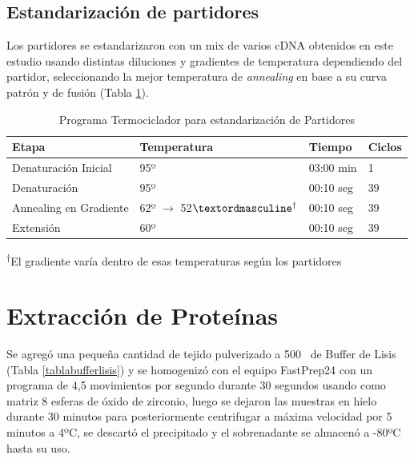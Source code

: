 \documentclass[12pt,a4paper,oneside]{scrbook}
\begin{document}
\subsection{Estandarización de partidores}

Los partidores se estandarizaron con un mix de varios cDNA obtenidos en
este estudio usando distintas diluciones y gradientes de temperatura
dependiendo del partidor, seleccionando la mejor temperatura de
\emph{annealing} en base a su curva patrón y de fusión (Tabla
\ref{tabla:estandar}).

\begin{table}[h!]
\sffamily
  \begin{center}
    \begin{threeparttable}
      \caption{Programa Termociclador para estandarización de Partidores}\label{tabla:estandar}
      \begin{tabularx}{13cm}{l X l l}
    \toprule
    \textbf{Etapa} & \textbf{Temperatura} & \textbf{Tiempo} & \textbf{Ciclos} \\
    \midrule
    Denaturación Inicial & 95º & 03:00 min & 1 \\
    Denaturación & 95º & 00:10 seg & 39\\
    Annealing en Gradiente & 62º $\rightarrow$ 52$º\textsuperscript{$\dagger$}$ & 00:10 seg & 39 \\
    Extensión & 60º & 00:10 seg & 39 \\
    \bottomrule
      \end{tabularx}
    \begin{tablenotes}
      \item \textsuperscript{$\dagger$}El gradiente varía dentro de esas temperaturas según los partidores
\end{tablenotes}
\end{threeparttable}
\end{center}
\end{table}

\section{Extracción de Proteínas}

Se agregó una pequeña cantidad de tejido pulverizado a
500\si{\micro\litro} de Buffer de Lisis (Tabla \ref{tablabufferlisis}) y
se homogenizó con el equipo FastPrep24 con un programa de 4,5
movimientos por segundo durante 30 segundos usando como matriz 8 esferas
de óxido de zirconio, luego se dejaron las muestras en hielo durante 30
minutos para posteriormente centrifugar a máxima velocidad por 5 minutos
a 4ºC, se descartó el precipitado y el sobrenadante se almacenó a -80ºC
hasta su uso.
\end{document}
